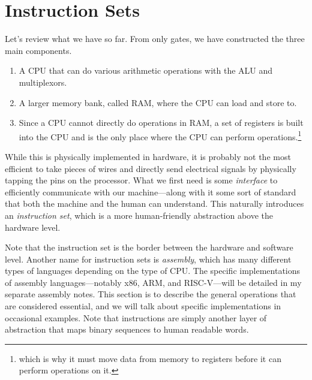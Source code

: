 \section{Instruction Sets} 
  
  Let's review what we have so far. From only gates, we have constructed the three main components. 
  \begin{enumerate}
    \item A CPU that can do various arithmetic operations with the ALU and multiplexors. 
    \item A larger memory bank, called RAM, where the CPU can load and store to. 
    \item Since a CPU cannot directly do operations in RAM, a set of registers is built into the CPU and is the only place where the CPU can perform operations.\footnote{which is why it must move data from memory to registers before it can perform operations on it.}
  \end{enumerate}

  While this is physically implemented in hardware, it is probably not the most efficient to take pieces of wires and directly send electrical signals by physically tapping the pins on the processor. What we first need is some \textit{interface} to efficiently communicate with our machine---along with it some sort of standard that both the machine and the human can understand. This naturally introduces an \textit{instruction set}, which is a more human-friendly abstraction above the hardware level. 

  Note that the instruction set is the border between the hardware and software level. Another name for instruction sets is \textit{assembly}, which has many different types of languages depending on the type of CPU. The specific implementations of assembly languages---notably x86, ARM, and RISC-V---will be detailed in my separate assembly notes. This section is to describe the general operations that are considered essential, and we will talk about specific implementations in occasional examples. Note that instructions are simply another layer of abstraction that maps binary sequences to human readable words. 

